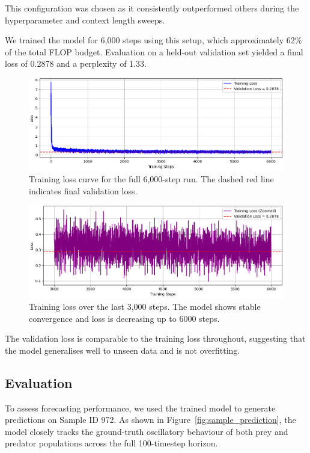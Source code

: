 \documentclass[a4paper,12pt]{article}
\begin{document}
This configuration was chosen as it consistently outperformed others during the hyperparameter and context length sweeps.

We trained the model for 6,000 steps using this setup, which approximately 62\% of the total FLOP budget. Evaluation on a held-out validation set yielded a final loss of 0.2878 and a perplexity of 1.33.

\begin{figure}[H]
    \centering
    \includegraphics[width=0.85\linewidth]{training_loss.png}
    \caption{Training loss curve for the full 6,000-step run. The dashed red line indicates final validation loss.}
    \label{fig:training_loss}
\end{figure}

\begin{figure}[H]
    \centering
    \includegraphics[width=0.85\linewidth]{zoomed_training_loss.png}
    \caption{Training loss over the last 3,000 steps. The model shows stable convergence and loss is decreasing up to 6000 steps.}
    \label{fig:zoomed_training_loss}
\end{figure}

The validation loss is comparable to the training loss throughout, suggesting that the model generalises well to unseen data and is not overfitting.

\subsection*{Evaluation}

To assess forecasting performance, we used the trained model to generate predictions on Sample ID 972. As shown in Figure~\ref{fig:sample_prediction}, the model closely tracks the ground-truth oscillatory behaviour of both prey and predator populations across the full 100-timestep horizon.
\end{document}
